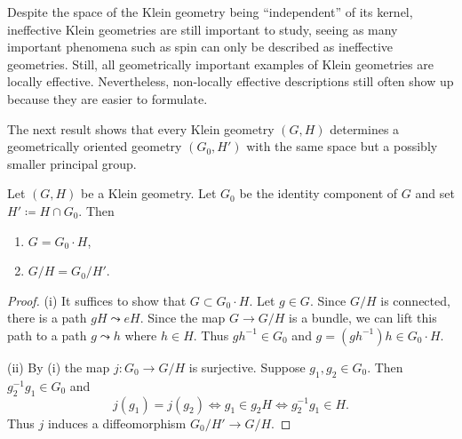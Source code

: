 \begin{rem}
    Despite the space of the Klein geometry being ``independent'' of its kernel, ineffective Klein geometries are still important to study, seeing as many important phenomena such as spin can only be described as ineffective geometries. Still, all geometrically important examples of Klein geometries are locally effective. Nevertheless, non-locally effective descriptions still often show up because they are easier to formulate. 
\end{rem}

The next result shows that every Klein geometry $(G,H)$ determines a geometrically oriented geometry $(G_0,H')$ with the same space but a possibly smaller principal group.

\begin{prop}
    Let $(G,H)$ be a Klein geometry. Let $G_0$ be the identity component of $G$ and set $H'\coloneqq H\cap G_0$. Then
    \begin{enumerate}[label=(\roman*)]
        \item $G=G_0\cdot H$,
        \item $G\slash H=G_0\slash H'$.
    \end{enumerate}
\end{prop}
\begin{proof}
    (i) It suffices to show that $G\subset G_0\cdot H$. Let $g\in G$. Since $G\slash H$ is connected, there is a path $gH\leadsto eH$. Since the map $G\to G\slash H$ is a bundle, we can lift this path to a path $g\leadsto h$ where $h\in H$. Thus $gh^{-1}\in G_0$ and $g=(gh^{-1})h\in G_0\cdot H$.

    (ii) By (i) the map $j:G_0\to G\slash H$ is surjective. Suppose $g_1,g_2\in G_0$. Then $g_2^{-1}g_1\in G_0$ and
    \[j(g_1)=j(g_2)\Leftrightarrow g_1\in g_2H\Leftrightarrow g_2^{-1}g_1\in H.\]
    Thus $j$ induces a diffeomorphism $G_0\slash H'\to G\slash H$.
\end{proof}



